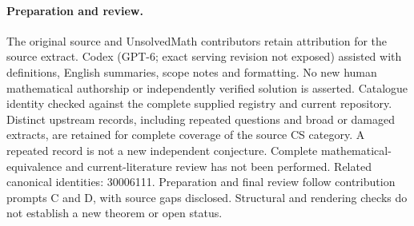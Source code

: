 \documentclass[11pt]{article}
\begin{document}
\paragraph{Preparation and review.}
The original source and UnsolvedMath contributors retain attribution for the source extract. Codex (GPT-6; exact serving revision not exposed) assisted with definitions, English summaries, scope notes and formatting. No new human mathematical authorship or independently verified solution is asserted. Catalogue identity checked against the complete supplied registry and current repository. Distinct upstream records, including repeated questions and broad or damaged extracts, are retained for complete coverage of the source CS category. A repeated record is not a new independent conjecture. Complete mathematical-equivalence and current-literature review has not been performed. Related canonical identities: 30006111. Preparation and final review follow contribution prompts C and D, with source gaps disclosed. Structural and rendering checks do not establish a new theorem or open status.
\label{end:statement}
\end{document}
